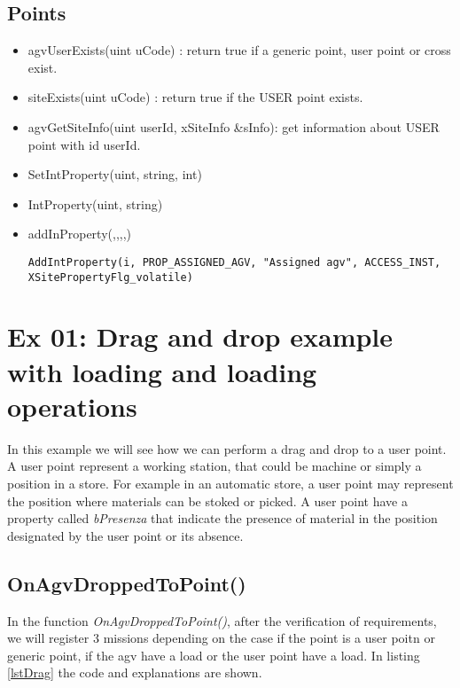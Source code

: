 \subsection{Points}

\begin{itemize}
	\item agvUserExists(uint uCode) : return true if a generic point, user point or cross exist.
	\item siteExists(uint uCode) : return true if the USER point exists.
	\item agvGetSiteInfo(uint userId, xSiteInfo \&sInfo): get information about USER point with id userId.\\
\end{itemize}

\begin{itemize}
	\item SetIntProperty(uint, string, int)
	\item IntProperty(uint, string)
	\item addInProperty(,,,,)
	\begin{lstlisting}[frame=none]
	AddIntProperty(i, PROP_ASSIGNED_AGV, "Assigned agv", ACCESS_INST, XSitePropertyFlg_volatile)
	\end{lstlisting}
\end{itemize}	

\section{Ex 01: Drag and drop example with loading and loading operations}

In this example we will see how we can perform a drag and drop to a user point. A user point represent a working station, that could be machine or simply a position in a store. For example in an automatic store, a user point may represent the position where materials can be stoked or picked. A user point have a property called \textit{bPresenza} that indicate the presence of material in the position designated by the user point or its absence.\\

\subsection*{OnAgvDroppedToPoint()}
In the function \textit{OnAgvDroppedToPoint()}, after the verification of requirements, we will register 3 missions depending on the case if the point is a user poitn or generic point, if the agv have a load or the user point have a load. In listing \ref{lstDrag} the code and explanations are shown.

